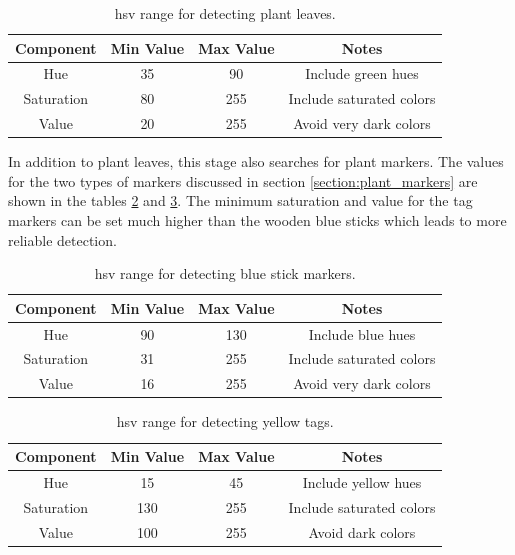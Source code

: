 \begin{table}
    \begin{center}
    \caption[Plant leaf detection values]{\ac{hsv} range for detecting plant leaves.}
    \begin{tabular}[c]{|c|c|c|c|}
        \hline
        Component & Min Value & Max Value & Notes \\
        \hline
        Hue        & 35  & 90  & Include green hues        \\
        Saturation & 80  & 255 & Include saturated colors  \\
        Value      & 20  & 255 & Avoid very dark colors    \\
        \hline
    \end{tabular}
    \label{table:plant_leaves_hsv_ranges}
   \end{center}
\end{table}

In addition to plant leaves, this stage also searches for plant markers.  The values for the two types of markers discussed in section \ref{section:plant_markers} are shown in the tables \ref{table:stick_hsv_ranges} and \ref{table:tag_ranges}.  The minimum saturation and value for the tag markers can be set much higher than the wooden blue sticks which leads to more reliable detection.   

\begin{table}
    \begin{center}
    \caption[Blue stick detection values]{\ac{hsv} range for detecting blue stick markers.}
    \begin{tabular}[c]{|c|c|c|c|}
        \hline
        Component & Min Value & Max Value & Notes \\
        \hline
        Hue        & 90  & 130 & Include blue hues        \\
        Saturation & 31  & 255 & Include saturated colors  \\
        Value      & 16  & 255 & Avoid very dark colors    \\
        \hline
    \end{tabular}
    \label{table:stick_hsv_ranges}
   \end{center}
\end{table}

\begin{table}
    \begin{center}
    \caption[Yellow tags detection values]{\ac{hsv} range for detecting yellow tags.}
    \begin{tabular}[c]{|c|c|c|c|}
        \hline
        Component & Min Value & Max Value & Notes \\
        \hline
        Hue        & 15  & 45  & Include yellow hues       \\
        Saturation & 130 & 255 & Include saturated colors  \\
        Value      & 100 & 255 & Avoid dark colors         \\
        \hline
    \end{tabular}
    \label{table:tag_ranges}
   \end{center}
\end{table}

